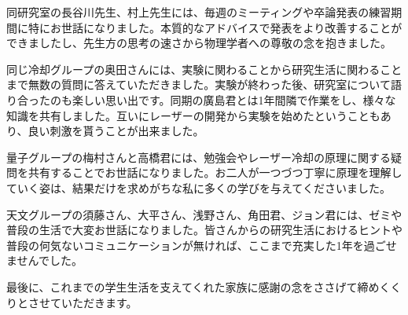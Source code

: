 \documentclass[dvipdfmx]{jsreport}
\begin{document}
同研究室の長谷川先生、村上先生には、毎週のミーティングや卒論発表の練習期間に特にお世話になりました。本質的なアドバイスで発表をより改善することができましたし、先生方の思考の速さから物理学者への尊敬の念を抱きました。

同じ冷却グループの奥田さんには、実験に関わることから研究生活に関わることまで無数の質問に答えていただきました。実験が終わった後、研究室について語り合ったのも楽しい思い出です。同期の廣島君とは1年間隣で作業をし、様々な知識を共有しました。互いにレーザーの開発から実験を始めたということもあり、良い刺激を貰うことが出来ました。

量子グループの梅村さんと高橋君には、勉強会やレーザー冷却の原理に関する疑問を共有することでお世話になりました。お二人が一つづつ丁寧に原理を理解していく姿は、結果だけを求めがちな私に多くの学びを与えてくださいました。

天文グループの須藤さん、大平さん、浅野さん、角田君、ジョン君には、ゼミや普段の生活で大変お世話になりました。皆さんからの研究生活におけるヒントや普段の何気ないコミュニケーションが無ければ、ここまで充実した1年を過ごせませんでした。

最後に、これまでの学生生活を支えてくれた家族に感謝の念をささげて締めくくりとさせていただきます。
\end{document}
